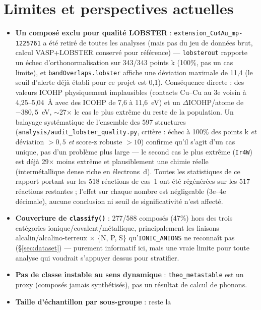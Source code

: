 \documentclass[11pt,a4paper]{article}
\begin{document}
\section{Limites et perspectives actuelles}
\label{sec:limites-actuelles}

\begin{itemize}
  \item \textbf{Un composé exclu pour qualité LOBSTER} :
    \texttt{extension\_Cu4Au\_mp-1225761} a été retiré de toutes les
    analyses (mais pas du jeu de données brut, calcul VASP+LOBSTER
    conservé pour référence) --- \texttt{lobsterout} rapporte un échec
    d'orthonormalisation sur 343/343 points k (100\%, pas un cas
    limite), et \texttt{bandOverlaps.lobster} affiche une déviation
    maximale de 11,4 (le seuil d'alerte déjà établi pour ce projet est
    0,1). Conséquence directe : des valeurs ICOHP physiquement
    implausibles (contacts Cu--Cu au 3e voisin à 4,25--5,04~\AA{}
    avec des ICOHP de 7,6 à 11,6~eV) et un $\Delta$ICOHP/atome de
    $-380,5$~eV, $\sim$27$\times$ le cas le plus extrême du reste de la
    population. Un balayage systématique de l'ensemble des 597
    structures (\texttt{analysis/audit\_lobster\_quality.py}, critère :
    échec à 100\% des points k \emph{et} déviation $>0,5$ \emph{et}
    score-z robuste $>10$) confirme qu'il s'agit d'un cas unique, pas
    d'un problème plus large --- le second cas le plus extrême
    (\texttt{Ir4W}) est déjà 29$\times$ moins extrême et plausiblement
    une chimie réelle (intermétallique dense riche en électrons~d).
    Toutes les statistiques de ce rapport portant sur les 518 réactions
    de cas~1 ont été régénérées sur les 517 réactions restantes ;
    l'effet sur chaque nombre est négligeable (3e--4e
    décimale), aucune conclusion ni seuil de significativité n'est
    affecté.
  \item \textbf{Couverture de \texttt{classify()}} : 277/588 composés
    (47\%) hors des trois catégories ionique/covalent/métallique,
    principalement les liaisons alcalin/alcalino-terreux $\times$
    \{N, P, S\} qu'\texttt{IONIC\_ANIONS} ne reconnaît pas
    (\S\ref{sec:dataset}) --- purement informatif ici, mais une vraie
    limite pour toute analyse qui voudrait s'appuyer dessus pour
    stratifier.
  \item \textbf{Pas de classe \og{}instable\fg{} au sens dynamique} :
    \texttt{theo\_metastable} est un proxy (composés jamais synthétisés),
    pas un résultat de calcul de phonons.
  \item \textbf{Taille d'échantillon par sous-groupe} : reste la

\end{itemize}
\end{document}
